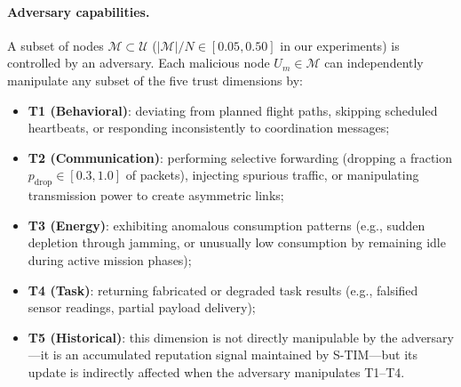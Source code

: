 \documentclass[notspecified,article,submit,moreauthors]{Definitions/mdpi}
\begin{document}
\paragraph{Adversary capabilities.}
A subset of nodes $\mathcal{M} \subset \mathcal{U}$ ($|\mathcal{M}|/N \in [0.05, 0.50]$ in our experiments) is controlled by an adversary. Each malicious node $U_m \in \mathcal{M}$ can independently manipulate any subset of the five trust dimensions by:
\begin{itemize}[topsep=0pt,itemsep=0pt]
    \item \textbf{T1 (Behavioral)}: deviating from planned flight paths, skipping scheduled heartbeats, or responding inconsistently to coordination messages;
    \item \textbf{T2 (Communication)}: performing selective forwarding (dropping a fraction $p_{\text{drop}} \in [0.3, 1.0]$ of packets), injecting spurious traffic, or manipulating transmission power to create asymmetric links;
    \item \textbf{T3 (Energy)}: exhibiting anomalous consumption patterns (e.g., sudden depletion through jamming, or unusually low consumption by remaining idle during active mission phases);
    \item \textbf{T4 (Task)}: returning fabricated or degraded task results (e.g., falsified sensor readings, partial payload delivery);
    \item \textbf{T5 (Historical)}: this dimension is not directly manipulable by the adversary---it is an accumulated reputation signal maintained by S-TIM---but its update is indirectly affected when the adversary manipulates T1--T4.
\end{itemize}
\end{document}
